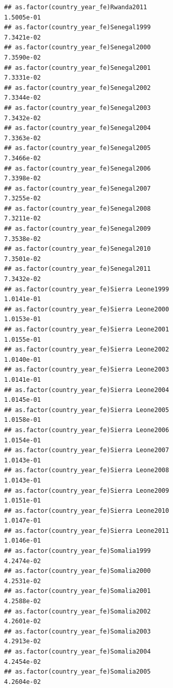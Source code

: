 \documentclass[
  a4paper,
]{article}
\begin{document}
\begin{verbatim}
## as.factor(country_year_fe)Rwanda2011                            1.5005e-01
## as.factor(country_year_fe)Senegal1999                           7.3421e-02
## as.factor(country_year_fe)Senegal2000                           7.3590e-02
## as.factor(country_year_fe)Senegal2001                           7.3331e-02
## as.factor(country_year_fe)Senegal2002                           7.3344e-02
## as.factor(country_year_fe)Senegal2003                           7.3432e-02
## as.factor(country_year_fe)Senegal2004                           7.3363e-02
## as.factor(country_year_fe)Senegal2005                           7.3466e-02
## as.factor(country_year_fe)Senegal2006                           7.3398e-02
## as.factor(country_year_fe)Senegal2007                           7.3255e-02
## as.factor(country_year_fe)Senegal2008                           7.3211e-02
## as.factor(country_year_fe)Senegal2009                           7.3538e-02
## as.factor(country_year_fe)Senegal2010                           7.3501e-02
## as.factor(country_year_fe)Senegal2011                           7.3432e-02
## as.factor(country_year_fe)Sierra Leone1999                      1.0141e-01
## as.factor(country_year_fe)Sierra Leone2000                      1.0153e-01
## as.factor(country_year_fe)Sierra Leone2001                      1.0155e-01
## as.factor(country_year_fe)Sierra Leone2002                      1.0140e-01
## as.factor(country_year_fe)Sierra Leone2003                      1.0141e-01
## as.factor(country_year_fe)Sierra Leone2004                      1.0145e-01
## as.factor(country_year_fe)Sierra Leone2005                      1.0158e-01
## as.factor(country_year_fe)Sierra Leone2006                      1.0154e-01
## as.factor(country_year_fe)Sierra Leone2007                      1.0143e-01
## as.factor(country_year_fe)Sierra Leone2008                      1.0143e-01
## as.factor(country_year_fe)Sierra Leone2009                      1.0151e-01
## as.factor(country_year_fe)Sierra Leone2010                      1.0147e-01
## as.factor(country_year_fe)Sierra Leone2011                      1.0146e-01
## as.factor(country_year_fe)Somalia1999                           4.2474e-02
## as.factor(country_year_fe)Somalia2000                           4.2531e-02
## as.factor(country_year_fe)Somalia2001                           4.2588e-02
## as.factor(country_year_fe)Somalia2002                           4.2601e-02
## as.factor(country_year_fe)Somalia2003                           4.2913e-02
## as.factor(country_year_fe)Somalia2004                           4.2454e-02
## as.factor(country_year_fe)Somalia2005                           4.2604e-02

\end{verbatim}
\end{document}
